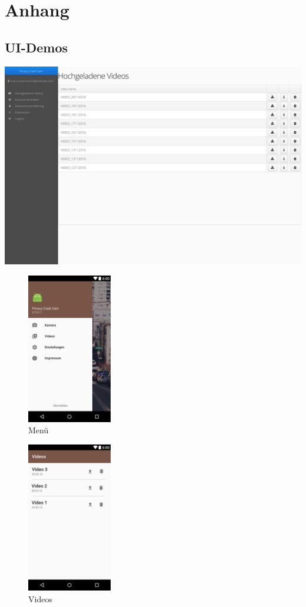 \chapter{Anhang}

\section{UI-Demos}
\includegraphics[width=1\textwidth]{subtopicsFuncspec/Res/UI-Demos/Webinterface.png}
\begin{figure}
	\centering
	\includegraphics[width=0.33\textwidth]{subtopicsFuncspec/Res/Mockups/Portrait_camera_view_menu.png}
	\caption{Menü}
\end{figure}
\begin{figure}
	\centering
	\includegraphics[width=0.33\textwidth]{subtopicsFuncspec/Res/Mockups/Videos_list1.png}
	\caption{Videos}
\end{figure}
